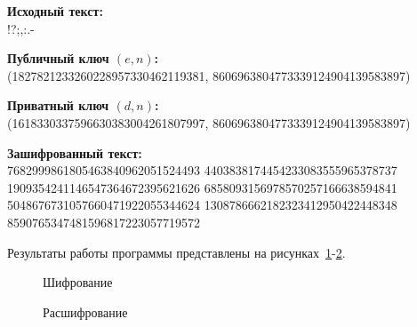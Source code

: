 \textbf{Исходный текст:} \\
    !?;,:.-

\textbf{Публичный ключ $(e, n)$:} \\
    (1827821233260228957330462119381, 8606963804773339124904139583897)

\textbf{Приватный ключ $(d, n)$:} \\
    (1618330337596630383004261807997, 8606963804773339124904139583897)

\textbf{Зашифрованный текст:} \\
    7682999861805463840962051524493 4403838174454233083555965378737
    1909354241146547364672395621626 6858093156978570257166638594841
    5048676731057660471922055344624 1308786662182323412950422448348
    8590765347481596817223057719572 

Результаты работы программы представлены на рисунках~\ref{ris:encode-test-4}-\ref{ris:decode-test-4}.

\vspace{\baselineskip}
\begin{figure}[H]
    \caption{Шифрование}
\label{ris:encode-test-4}
\end{figure}

\vspace{\baselineskip}
\begin{figure}[H]
    \caption{Расшифрование}
\label{ris:decode-test-4}
\end{figure}
